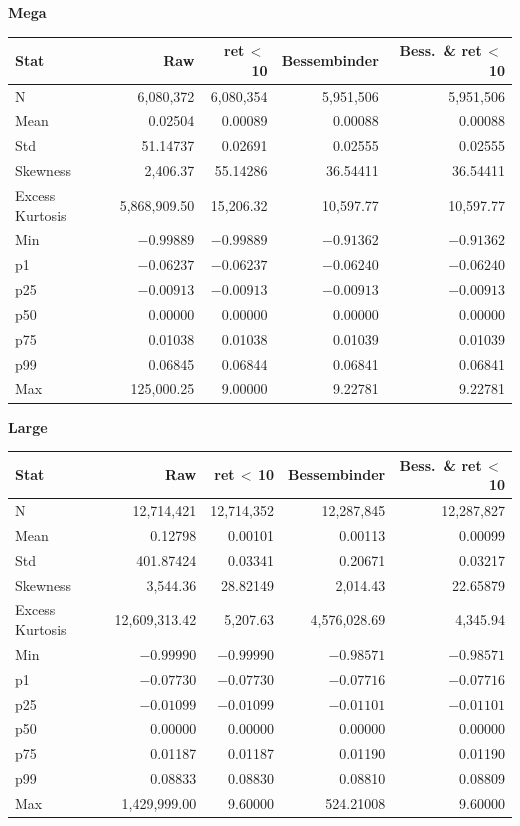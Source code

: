 \documentclass[10pt]{article}
\begin{document}
\begin{center}
\vspace{1.1em}
\textbf{Mega}\\[2pt]
\begin{tabular}{l r r r r}
\toprule
Stat & {Raw} & {ret\,$<$\,10} & {Bessembinder} & {Bess.\ \& ret\,$<$\,10} \\
\midrule
N & 6,080,372 & 6,080,354 & 5,951,506 & 5,951,506 \\
Mean & 0.02504 & 0.00089 & 0.00088 & 0.00088 \\
Std & 51.14737 & 0.02691 & 0.02555 & 0.02555 \\
Skewness & 2,406.37 & 55.14286 & 36.54411 & 36.54411 \\
Excess Kurtosis & 5,868,909.50 & 15,206.32 & 10,597.77 & 10,597.77 \\
Min & $-0.99889$ & $-0.99889$ & $-0.91362$ & $-0.91362$ \\
p1 & $-0.06237$ & $-0.06237$ & $-0.06240$ & $-0.06240$ \\
p25 & $-0.00913$ & $-0.00913$ & $-0.00913$ & $-0.00913$ \\
p50 & 0.00000 & 0.00000 & 0.00000 & 0.00000 \\
p75 & 0.01038 & 0.01038 & 0.01039 & 0.01039 \\
p99 & 0.06845 & 0.06844 & 0.06841 & 0.06841 \\
Max & 125,000.25 & 9.00000 & 9.22781 & 9.22781 \\
\bottomrule
\end{tabular}

\vspace{1.1em}
\textbf{Large}\\[2pt]
\begin{tabular}{l r r r r}
\toprule
Stat & {Raw} & {ret\,$<$\,10} & {Bessembinder} & {Bess.\ \& ret\,$<$\,10} \\
\midrule
N & 12,714,421 & 12,714,352 & 12,287,845 & 12,287,827 \\
Mean & 0.12798 & 0.00101 & 0.00113 & 0.00099 \\
Std & 401.87424 & 0.03341 & 0.20671 & 0.03217 \\
Skewness & 3,544.36 & 28.82149 & 2,014.43 & 22.65879 \\
Excess Kurtosis & 12,609,313.42 & 5,207.63 & 4,576,028.69 & 4,345.94 \\
Min & $-0.99990$ & $-0.99990$ & $-0.98571$ & $-0.98571$ \\
p1 & $-0.07730$ & $-0.07730$ & $-0.07716$ & $-0.07716$ \\
p25 & $-0.01099$ & $-0.01099$ & $-0.01101$ & $-0.01101$ \\
p50 & 0.00000 & 0.00000 & 0.00000 & 0.00000 \\
p75 & 0.01187 & 0.01187 & 0.01190 & 0.01190 \\
p99 & 0.08833 & 0.08830 & 0.08810 & 0.08809 \\
Max & 1,429,999.00 & 9.60000 & 524.21008 & 9.60000 \\
\bottomrule
\end{tabular}


\end{center}
\end{document}
